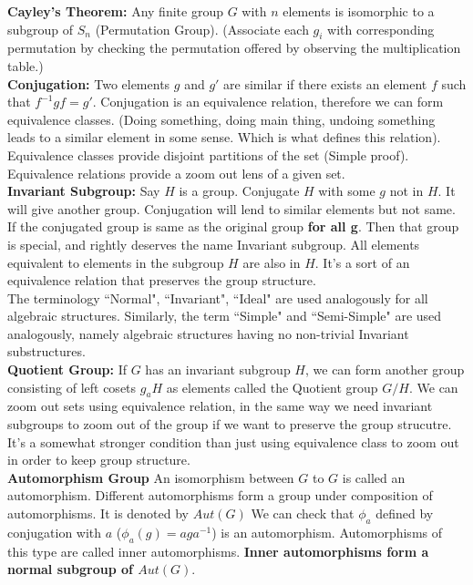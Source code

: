 \documentclass{report}
\begin{document}
\noindent\textbf{Cayley's Theorem:} Any finite group $G$ with $n$ elements is isomorphic to a subgroup of $S_n$ (Permutation Group). (Associate each $g_i$ with corresponding permutation by checking the permutation offered by observing the multiplication table.)\\

\noindent\textbf{Conjugation:} Two elements $g$ and $g'$ are similar if there exists an element $f$ such that $f^{-1}gf = g'$. Conjugation is an equivalence relation, therefore we can form equivalence classes. (Doing something, doing main thing, undoing something leads to a similar element in some sense. Which is what defines this relation). Equivalence classes provide disjoint partitions of the set (Simple proof). Equivalence relations provide a zoom out lens of a given set.\\

\noindent\textbf{Invariant Subgroup:} Say $H$ is a group. Conjugate $H$ with some $g$ not in $H$. It will give another group. Conjugation will lend to similar elements but not same. If the conjugated group is same as the original group \textbf{for all g}. Then that group is special, and rightly deserves the name Invariant subgroup. All elements equivalent to elements in the subgroup $H$ are also in $H$. It's a sort of an equivalence relation that preserves the group structure.\\

\noindent The terminology ``Normal", ``Invariant", ``Ideal" are used analogously for all algebraic structures. Similarly, the term ``Simple" and ``Semi-Simple" are used analogously, namely algebraic structures having no non-trivial Invariant substructures.\\

\noindent\textbf{Quotient Group:} If $G$ has an invariant subgroup $H$, we can form another group consisting of left cosets $g_aH$ as elements called the Quotient group $G/H$. We can zoom out sets using equivalence relation, in the same way we need invariant subgroups to zoom out of the group if we want to preserve the group strucutre. It's a somewhat stronger condition than just using equivalence class to zoom out in order to keep group structure. \\

\noindent\textbf{Automorphism Group} An isomorphism between $G$ to $G$ is called an automorphism. Different automorphisms form a group under composition of automorphisms. It is denoted by $Aut(G)$ We can check that $\phi_a$ defined by conjugation with $a$ ($\phi_a(g) = aga^{-1}$) is an automorphism. Automorphisms of this type are called inner automorphisms. \textbf{Inner automorphisms form a normal subgroup of $Aut(G)$}.
\end{document}
